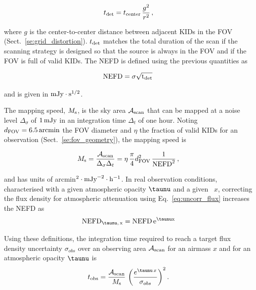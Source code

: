 \begin{equation}
  t_{\rm{det}} = t_{\rm{center}}\, \frac{g^2}{r^2}\,,
\label{eq:t_det}
\end{equation}

where $g$ is the center-to-center distance between adjacent KIDs in the FOV
(Sect.~\ref{se:grid_distortion}). $t_{\rm{det}}$ matches the total duration of
the scan if the scanning strategy is designed so that the source is always in
the FOV and if the FOV is full of valid KIDs. The NEFD is defined
using the previous quantities as 

\begin{equation}
  \rm{NEFD} = \sigma \sqrt{t_{\rm{det}}}\, 
\label{eq:nefd_def}
\end{equation}

and is given in $\rm{mJy}\cdot s^{1/2}$.

The mapping speed, $M_{\rm{s}}$, is the sky area $\mathcal{A}_{\rm{scan}}$ that
can be mapped at a noise level $\Delta_\sigma$ of $1\,\rm{mJy}$ in an
integration time $\Delta_t$ of one hour. Noting $d_{\rm{FOV}} =
6.5\,\rm{arcmin}$ the FOV diameter and $\eta$ the fraction of valid KIDs for an
observation (Sect.~\ref{se:fov_geometry}), the mapping speed is

\begin{equation}
M_{\rm{s}} = \frac{\mathcal{A}_{\rm{scan}}}{\Delta_\sigma\Delta_t} = 
\eta \, \frac{\pi}{4} d_{\rm{FOV}}^2 \, \frac{1}{\rm{NEFD}^2}\, ,
\label{eq:mapping_speed}
\end{equation}

and has units of arcmin$^2 \cdot \rm{mJy}^{-2} \cdot \rm{h}^{-1}$. 
In real observation conditions, characterised with a given atmospheric
opacity $\taunu$ and a given \airmass\ $x$, correcting the flux
density for atmospheric attenuation using Eq.~\ref{eq:uncorr_flux}   
increases the NEFD as 
\begin{equation}
\rm{NEFD}_{\taunu,\, x} = \rm{NEFD}\, e^{\taunu x}
\label{eq:nefd_tau_el}
\end{equation}

Using these definitions, the integration time required to reach a target flux
density uncertainty $\sigma_{obs}$ over an observing area
$\mathcal{A}_{\rm{scan}}$ for an airmass $x$ and for an atmospheric opacity $\taunu$ is
\begin{equation}
  t_{\rm{obs}} = \frac{\mathcal{A}_{\rm{scan}}}{ M_{\rm{s}}} \, \left(\frac{e^{\taunu\, x}}{\sigma_{obs}}\right)^2.
\end{equation}


